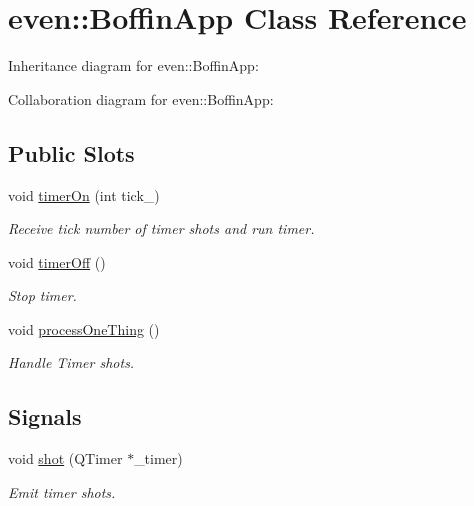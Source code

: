\hypertarget{classeven_1_1_boffin_app}{}\section{even\+:\+:Boffin\+App Class Reference}
\label{classeven_1_1_boffin_app}


Inheritance diagram for even\+:\+:Boffin\+App\+:


Collaboration diagram for even\+:\+:Boffin\+App\+:
\subsection*{Public Slots}
\begin{DoxyCompactItemize}
\item 
\mbox{\label{classeven_1_1_boffin_app_a0296cd91e7e9a90a7bcd1f816ef0b4f3}} 
void \mbox{\hyperlink{classeven_1_1_boffin_app_a0296cd91e7e9a90a7bcd1f816ef0b4f3}{timer\+On}} (int tick\+\_\+)
\begin{DoxyCompactList}\small\item\em Receive tick number of timer shots and run timer. \end{DoxyCompactList}\item 
\mbox{\label{classeven_1_1_boffin_app_ad07eca175b69fc905cc3c45f5f830742}} 
void \mbox{\hyperlink{classeven_1_1_boffin_app_ad07eca175b69fc905cc3c45f5f830742}{timer\+Off}} ()
\begin{DoxyCompactList}\small\item\em Stop timer. \end{DoxyCompactList}\item 
\mbox{\label{classeven_1_1_boffin_app_af877f034651206d3df039bb5681f49b7}} 
void \mbox{\hyperlink{classeven_1_1_boffin_app_af877f034651206d3df039bb5681f49b7}{process\+One\+Thing}} ()
\begin{DoxyCompactList}\small\item\em Handle Timer shots. \end{DoxyCompactList}\end{DoxyCompactItemize}
\subsection*{Signals}
\begin{DoxyCompactItemize}
\item 
\mbox{\label{classeven_1_1_boffin_app_aef81a9b8fa795af2a153861b568b3c43}} 
void \mbox{\hyperlink{classeven_1_1_boffin_app_aef81a9b8fa795af2a153861b568b3c43}{shot}} (Q\+Timer $\ast$\+\_\+timer)
\begin{DoxyCompactList}\small\item\em Emit timer shots. \end{DoxyCompactList}\end{DoxyCompactItemize}
